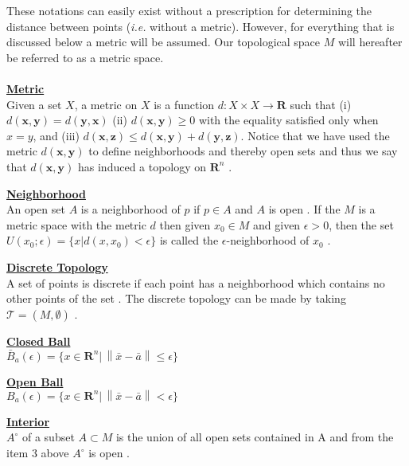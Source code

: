\documentclass[twocolumn]{article}
\newenvironment{defit}[1]
  {\noindent{$\bullet$}\underline{\textbf{#1}}\\}
  {\\}
\begin{document}
These notations can easily exist without a prescription for 
determining the distance between points (\emph{i.e.} without a 
metric).  However, for everything that is discussed below a metric 
will be assumed.  Our topological space $M$ will hereafter be referred 
to as a metric space.
\\\\
\begin{defit}{Metric}
Given a set $X$, a metric on $X$ is a function $d: X \times X 
\rightarrow \mathbf{R}$ such that (i) $d( \mathbf{x}, \mathbf{y} ) =  
d( \mathbf{y}, \mathbf{x} )$ (ii) $d( \mathbf{x}, \mathbf{y} ) \geq 0$ 
with the equality satisfied only when $ x= y$, and (iii) 
$d( \mathbf{x}, \mathbf{z} ) \leq d( \mathbf{x}, \mathbf{y} ) + 
d( \mathbf{y}, \mathbf{z} )$.  
Notice that we have used the metric 
$d(\mathbf{x},\mathbf{y})$ to define neighborhoods and thereby open 
sets and thus we say that $d(\mathbf{x},\mathbf{y})$ has induced a 
topology on $\mathbf{R}^{n}$ \cite{schutz80}.
\end{defit}

\begin{defit}{Neighborhood}
 An open set $A$ is a neighborhood of $p$ if $p 
\in A$ and $A$ is open \cite{love_rund}.  If the $M$ is a metric space 
with the metric $d$ then given $x_0 \in M$ and given $\epsilon > 0$, 
then the set $U(x_0;\epsilon) = \{ x | d(x,x_0) < \epsilon \}$ is 
called the $\epsilon$-neighborhood of $x_0$ \cite{munkres}.
\end{defit}  

\begin{defit}{Discrete Topology}
A set of points is discrete if each point has a neighborhood
which contains no other points of the set \cite{schutz80}.  The 
discrete topology can be made by taking $\mathcal{T} = (M,\emptyset)$ 
\cite{wald}.
\end{defit}

\begin{defit}{Closed Ball}
${\bar B}_{a}(\epsilon) = \{ x \in \mathbf{R}^n | \, 
   \left\| {\bar x} - {\bar a} \right\| \leq \epsilon \}$ 
\cite{frankel}
\end{defit}   

\begin{defit}{Open Ball}
${B}_{a}(\epsilon) = \{ x \in \mathbf{R}^n | \,
   \left\| {\bar x} - {\bar a} \right\| < \epsilon \}$ \cite{frankel}
\end{defit}

\begin{defit}{Interior}
$A^{\circ}$ of a subset $A \subset M$ is the union 
of all open sets contained in A and from the item 3 above $A^{\circ}$ 
is open \cite{love_rund}.
\end{defit}
\end{document}

